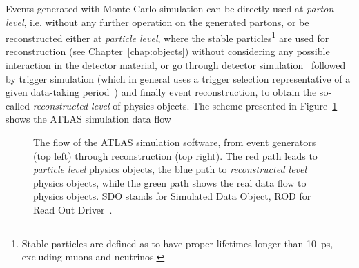 Events generated with Monte Carlo simulation can be directly
used at {\it parton level}, i.e. without any further operation on the
generated partons, or be reconstructed either at {\it particle level}, where
the stable particles\footnote{Stable particles are
defined as to have proper lifetimes longer than 10~ps, excluding
muons and neutrinos.} are used for reconstruction (see Chapter~\ref{chap:objects})
without considering any possible interaction in the detector material, 
or go through detector simulation~\cite{atlas_sim} followed by 
trigger simulation (which in general uses a trigger selection
representative of a given data-taking period~\cite{Galster:1622237}) and finally event
reconstruction, to obtain the so-called {\it reconstructed level} of
physics objects. The scheme presented in Figure~\ref{fig:outline}
shows the ATLAS simulation data flow 

\begin{figure}[htb]\begin{center}
	\caption{The flow of the ATLAS simulation software, from event generators (top left) through reconstruction (top right).
        The red path leads to {\it particle level} physics objects, the blue path to
        {\it reconstructed level} physics objects, while the green path shows the real data
        flow to physics objects.
        SDO stands for Simulated Data Object, ROD for Read Out Driver~\cite{atlas_sim}.\label{fig:outline}}
\end{center}\end{figure}

